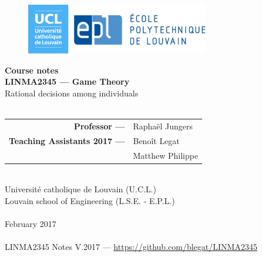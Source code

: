 \ifx \globalmark \undefined %

\else 	
\fi



\begin{titlepage}
\begin{center}



\vfill

\begin{figure}[!ht]
\centering
\includegraphics[width = 8cm]{Logo_UCL-EPL.eps}
\end{figure}







{ \bfseries Course notes }
\hrulefill\\[0.5cm]
\large{\textbf{LINMA2345 --- Game Theory}\\
Rational decisions among individuals} \\
\hrulefill\\[0.5cm]


\vfill
\vfill
\parbox[H][][c]{\textwidth}
	{
	\begin{tabular}{rl}
	\textbf{Professor ---} &  Rapha\"el Jungers \\	 		
	\textbf{Teaching Assistants 2017 ---} 	 &	Beno\^it Legat \\	
		     &	Matthew Philippe 	
	\end{tabular}
	}\par
	



%
$\,$\\[1cm]


Universit\'e catholique de Louvain (U.C.L.)\\
Louvain school of Engineering (L.S.E. - E.P.L.)\\
$\,$\\
February 2017\\
$\,$\\
\tiny{LINMA2345 Notes V.2017 --- \url{https://github.com/blegat/LINMA2345}}
\end{center}

\end{titlepage}







